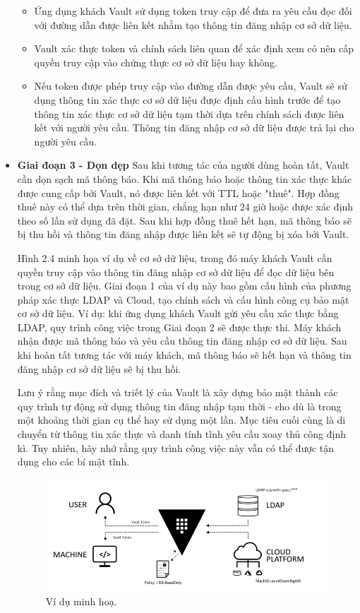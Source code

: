 \documentclass[12pt,a4paper]{report}
\begin{document}
\begin{itemize}
\begin{itemize}
			\item {Ứng dụng khách Vault sử dụng token truy cập để đưa ra yêu cầu đọc đối với đường dẫn được liên kết nhằm tạo thông tin đăng nhập cơ sở dữ liệu.}
			\item {Vault xác thực token và chính sách liên quan để xác định xem có nên cấp quyền truy cập vào chứng thực cơ sở dữ liệu hay không.}
			\item {Nếu token được phép truy cập vào đường dẫn được yêu cầu, Vault sẽ sử dụng thông tin xác thực cơ sở dữ liệu được định cấu hình trước để tạo thông tin xác thực cơ sở dữ liệu tạm thời dựa trên chính sách được liên kết với người yêu cầu. Thông tin đăng nhập cơ sở dữ liệu được trả lại cho người yêu cầu.}
		\end{itemize}
		\item \textbf{Giai đoạn 3 - Dọn dẹp}
		\smallskip
		\subitem
		{Sau khi tương tác của người dùng hoàn tất, Vault cần dọn sạch mã thông báo. Khi mã thông báo hoặc thông tin xác thực khác được cung cấp bởi Vault, nó được liên kết với TTL hoặc "thuê". Hợp đồng thuê này có thể dựa trên thời gian, chẳng hạn như 24 giờ hoặc được xác định theo số lần sử dụng đã đặt. Sau khi hợp đồng thuê hết hạn, mã thông báo sẽ bị thu hồi và thông tin đăng nhập được liên kết sẽ tự động bị xóa bởi Vault.}
		
		{Hình 2.4 minh họa ví dụ về cơ sở dữ liệu, trong đó máy khách Vault cần quyền truy cập vào thông tin đăng nhập cơ sở dữ liệu để đọc dữ liệu bên trong cơ sở dữ liệu. Giai đoạn 1 của ví dụ này bao gồm cấu hình của phương pháp xác thực LDAP và Cloud, tạo chính sách và cấu hình công cụ bảo mật cơ sở dữ liệu. Ví dụ: khi ứng dụng khách Vault gửi yêu cầu xác thực bằng LDAP, quy trình công việc trong Giai đoạn 2 sẽ được thực thi. Máy khách nhận được mã thông báo và yêu cầu thông tin đăng nhập cơ sở dữ liệu. Sau khi hoàn tất tương tác với máy khách, mã thông báo sẽ hết hạn và thông tin đăng nhập cơ sở dữ liệu sẽ bị thu hồi.}
		
		{Lưu ý rằng mục đích và triết lý của Vault là xây dựng bảo mật thành các quy trình tự động sử dụng thông tin đăng nhập tạm thời - cho dù là trong một khoảng thời gian cụ thể hay sử dụng một lần. Mục tiêu cuối cùng là di chuyển từ thông tin xác thực và danh tính tĩnh yêu cầu xoay thủ công định kì. Tuy nhiên, hãy nhớ rằng quy trình công việc này vẫn có thể được tận dụng cho các bí mật tĩnh.}
		\begin{figure}[h]
			\centering
			\includegraphics[width=1\textwidth]{"Pics/clean_up"}
			\caption{\label{fig:clean_up} Ví dụ minh hoạ.}
			\label{fig:clean_up}
		\end{figure}
	\end{itemize}
\end{document}

